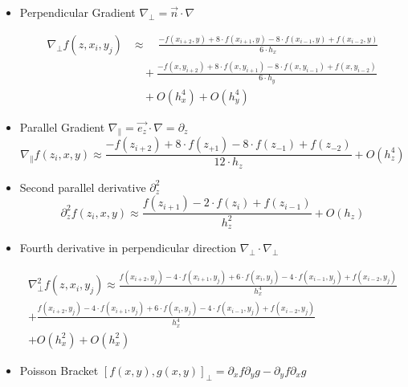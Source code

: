 \documentclass[master.tex]{subfiles}
\begin{document}
\begin{itemize}
    \item Perpendicular Gradient $\nabla_{\perp} = \vec{n}\cdot\nabla$\\
     \begin{small}
        \begin{equation}
        \begin{split}
            \nabla_{\perp} f(z, x_i,y_j) &\approx  \quad\frac{-f(x_{i+2},y) + 8 \cdot f(x_{i + 1}, y) -  8 \cdot f(x_{i - 1}, y) + f(x_{i - 2}, y)}{6 \cdot h_x} \\
            &\quad + \frac{-f(x,y_{i + 2}) + 8 \cdot f(x, y_{i + 1}) -  8 \cdot f(x, y_{i - 1}) + f(x, y_{i - 2})}{6 \cdot h_y}\\
            &\quad + O(h_x^4) + O(h_y^4)
        \end{split}
        \end{equation}
    \end{small}
    \item Parallel Gradient $\nabla_{\parallel} = \vec{e_z}\cdot\nabla = \partial_z$\\
    \begin{equation}
        \nabla_{\parallel} f(z_i,x,y) \approx \frac{-f(z_{i+2}) + 8 \cdot f(z_{+1}) - 8 \cdot f(z_{-1}) + f(z_{-2})}{12 \cdot h_z} + O(h_z^4)
    \end{equation}
    \item Second parallel derivative $\partial_z^2$\\
    \begin{equation}
           \partial_z^2f(z_i,x,y) \approx \frac{f(z_{i+1})-2\cdot f(z_i)+ f(z_{i-1})}{h_z^2} + O(h_z)
    \end{equation}
    \item Fourth derivative in perpendicular direction $\nabla_\perp \cdot \nabla_\perp$\\
    \begin{footnotesize}
    \begin{equation}
    \begin{split}
    \nabla_\perp^2f(z,x_i,y_j) \approx \frac{f(x_{i+2},y_j) - 4 \cdot f(x_{i+1},y_j) +6\cdot f(x_i,y_j) -4 \cdot f(x_{i-1},y_j) + f(x_{i-2}, y_j)}{h_x^4}  \\ + \frac{f(x_{i+2},y_j) - 4 \cdot f(x_{i+1},y_j) +6\cdot f(x_i,y_j) -4 \cdot f(x_{i-1},y_j) + f(x_{i-2}, y_j)}{h_x^4}  \\  + O(h_x^2) + O(h_x^2)
    \end{split}
    \end{equation}
    \end{footnotesize}
    \item Poisson Bracket $[f(x,y),g(x,y)]_\perp = \partial_x f \partial_y g - \partial_y f \partial_x g$
\end{itemize}
\end{document}
